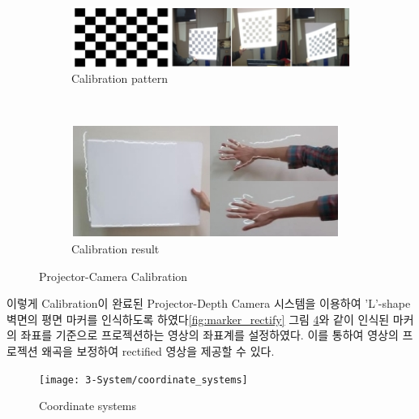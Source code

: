 \begin{figure}[!h]
	\centering
        \begin{subfigure}[b]{1.0\columnwidth}
	        \centering
                \includegraphics[width=\textwidth]{3-System/Calibration_pattern}
                \caption{Calibration pattern}
                \label{fig:calibration_pattern}
        \end{subfigure}%
        \\
        \begin{subfigure}[b]{1.0\columnwidth}
            \centering
            \includegraphics[width=\textwidth]{3-System/Calibration_result}
                \caption{Calibration result}
                \label{fig:calib_result}
        \end{subfigure}
	\caption{Projector-Camera Calibration}
    \label{fig:calibration}
\end{figure}

이렇게 Calibration이 완료된 Projector-Depth Camera 시스템을 이용하여 'L'-shape 벽면의 평면 마커를 인식하도록 하였다\ref{fig:marker_rectify} 그림 \ref{fig:coordinate}와 같이 인식된 마커\cite{seo_enhancing_2011}의 좌표를 기준으로 프로젝션하는 영상의 좌표계를 설정하였다. 이를 통하여 영상의 프로젝션 왜곡을 보정하여 rectified 영상을 제공할 수 있다. 
\begin{figure}[!h]
\centering
\texttt{[image: 3-System/coordinate\_systems]}
\caption{Coordinate systems}
\label{fig:coordinate}
\end{figure}


